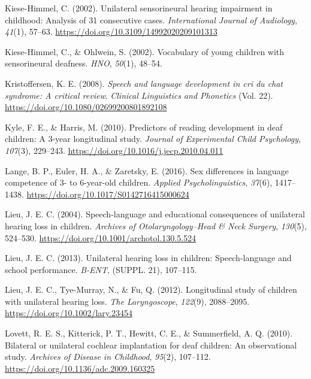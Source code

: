 \documentclass[english,man]{apa6}
\begin{document}
\leavevmode\hypertarget{ref-kiese-himmel2002}{}%
Kiese-Himmel, C. (2002). Unilateral sensorineural hearing impairment in childhood: Analysis of 31 consecutive cases. \emph{International Journal of Audiology}, \emph{41}(1), 57--63. \url{https://doi.org/10.3109/14992020209101313}

\leavevmode\hypertarget{ref-kiese-himmel2002a}{}%
Kiese-Himmel, C., \& Ohlwein, S. (2002). Vocabulary of young children with sensorineural deafness. \emph{HNO}, \emph{50}(1), 48--54.

\leavevmode\hypertarget{ref-kristoffersen2008}{}%
Kristoffersen, K. E. (2008). \emph{Speech and language development in cri du chat syndrome: A critical review}. \emph{Clinical Linguistics and Phonetics} (Vol. 22). \url{https://doi.org/10.1080/02699200801892108}

\leavevmode\hypertarget{ref-kyle2010}{}%
Kyle, F. E., \& Harris, M. (2010). Predictors of reading development in deaf children: A 3-year longitudinal study. \emph{Journal of Experimental Child Psychology}, \emph{107}(3), 229--243. \url{https://doi.org/10.1016/j.jecp.2010.04.011}

\leavevmode\hypertarget{ref-lange2016}{}%
Lange, B. P., Euler, H. A., \& Zaretsky, E. (2016). Sex differences in language competence of 3- to 6-year-old children. \emph{Applied Psycholinguistics}, \emph{37}(6), 1417--1438. \url{https://doi.org/10.1017/S0142716415000624}

\leavevmode\hypertarget{ref-lieu2004}{}%
Lieu, J. E. C. (2004). Speech-language and educational consequences of unilateral hearing loss in children. \emph{Archives of Otolaryngology--Head \& Neck Surgery}, \emph{130}(5), 524--530. \url{https://doi.org/10.1001/archotol.130.5.524}

\leavevmode\hypertarget{ref-lieu2013}{}%
Lieu, J. E. C. (2013). Unilateral hearing loss in children: Speech-language and school performance. \emph{B-ENT}, (SUPPL. 21), 107--115.

\leavevmode\hypertarget{ref-lieu2012}{}%
Lieu, J. E. C., Tye-Murray, N., \& Fu, Q. (2012). Longitudinal study of children with unilateral hearing loss. \emph{The Laryngoscope}, \emph{122}(9), 2088--2095. \url{https://doi.org/10.1002/lary.23454}

\leavevmode\hypertarget{ref-lovett2010}{}%
Lovett, R. E. S., Kitterick, P. T., Hewitt, C. E., \& Summerfield, A. Q. (2010). Bilateral or unilateral cochlear implantation for deaf children: An observational study. \emph{Archives of Disease in Childhood}, \emph{95}(2), 107--112. \url{https://doi.org/10.1136/adc.2009.160325}
\end{document}

